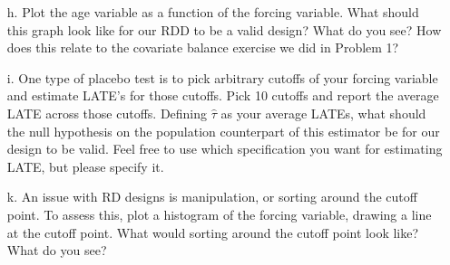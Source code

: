 \documentclass[]{tufte-handout}
\begin{document}
\begin{enumerate}
\item[h. ] Plot the age variable as a function of the forcing variable. What should this graph look like for our RDD to be a valid design? What do you see? How does this relate to the covariate balance exercise we did in Problem 1?

\item[i. ] One type of placebo test is to pick arbitrary cutoffs of your forcing variable and estimate LATE's for those cutoffs. Pick 10 cutoffs and report the average LATE across those cutoffs. Defining $\hat{\tau}$ as your average LATEs, what should the null hypothesis on the population counterpart of this estimator be for our design to be valid. Feel free to use which specification you want for estimating LATE, but please specify it.

\item[k. ] An issue with RD designs is manipulation, or sorting around the cutoff point. To assess this, plot a histogram of the forcing variable, drawing a line at the cutoff point. What would sorting around the cutoff point look like? What do you see? 


\end{enumerate}
\end{document}
